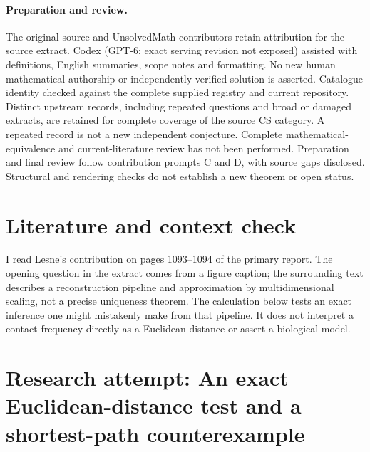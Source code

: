 \documentclass[11pt]{article}
\begin{document}
\paragraph{Preparation and review.}
The original source and UnsolvedMath contributors retain attribution for the source extract. Codex (GPT-6; exact serving revision not exposed) assisted with definitions, English summaries, scope notes and formatting. No new human mathematical authorship or independently verified solution is asserted. Catalogue identity checked against the complete supplied registry and current repository. Distinct upstream records, including repeated questions and broad or damaged extracts, are retained for complete coverage of the source CS category. A repeated record is not a new independent conjecture. Complete mathematical-equivalence and current-literature review has not been performed. Preparation and final review follow contribution prompts C and D, with source gaps disclosed. Structural and rendering checks do not establish a new theorem or open status.
\label{end:statement}

\section{Literature and context check}

I read Lesne's contribution on pages 1093--1094 of the primary report.
The opening question in the extract comes from a figure caption; the surrounding
text describes a reconstruction pipeline and approximation by multidimensional
scaling, not a precise uniqueness theorem. The calculation below tests an exact
inference one might mistakenly make from that pipeline. It does not interpret
a contact frequency directly as a Euclidean distance or assert a biological model.

\section{Research attempt: An exact Euclidean-distance test and a shortest-path counterexample}
\end{document}
